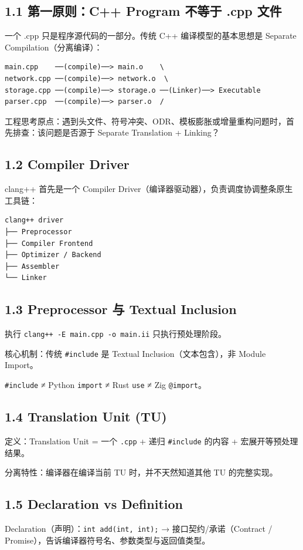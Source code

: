 \documentclass[11pt,a4paper]{article}
\begin{document}
\subsection{1.1 第一原则：C++ Program 不等于 .cpp 文件}
一个 .cpp 只是程序源代码的一部分。传统 C++ 编译模型的基本思想是 Separate Compilation（分离编译）：

\begin{lstlisting}[language=text]
main.cpp    ──(compile)──> main.o    \
network.cpp ──(compile)──> network.o  \
storage.cpp ──(compile)──> storage.o ──(Linker)──> Executable
parser.cpp  ──(compile)──> parser.o  /
\end{lstlisting}
工程思考原点：遇到头文件、符号冲突、ODR、模板膨胀或增量重构问题时，首先排查：该问题是否源于 Separate Translation + Linking？

\subsection{1.2 Compiler Driver}
clang++ 首先是一个 Compiler Driver（编译器驱动器），负责调度协调整条原生工具链：

\begin{lstlisting}[language=text]
clang++ driver
├── Preprocessor
├── Compiler Frontend
├── Optimizer / Backend
├── Assembler
└── Linker
\end{lstlisting}
\subsection{1.3 Preprocessor 与 Textual Inclusion}
执行 \texttt{clang++ -E main.cpp -o main.ii} 只执行预处理阶段。

核心机制：传统 \texttt{\#include} 是 Textual Inclusion（文本包含），非 Module Import。

\texttt{\#include} ≠ Python \texttt{import} ≠ Rust \texttt{use} ≠ Zig \texttt{@import}。

\subsection{1.4 Translation Unit (TU)}
定义：Translation Unit = 一个 \texttt{.cpp} + 递归 \texttt{\#include} 的内容 + 宏展开等预处理结果。

分离特性：编译器在编译当前 TU 时，并不天然知道其他 TU 的完整实现。

\subsection{1.5 Declaration vs Definition}
Declaration（声明）：\texttt{int add(int, int);} → 接口契约/承诺（Contract / Promise），告诉编译器符号名、参数类型与返回值类型。
\end{document}
